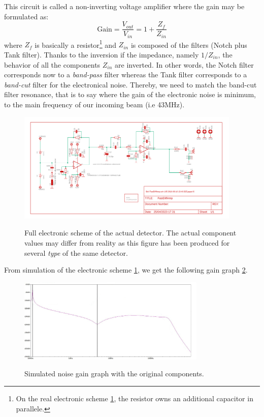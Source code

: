 \documentclass[10pt]{report}
\begin{document}
This circuit is called a non-inverting voltage amplifier where the gain may be formulated as:
\begin{equation}
\textrm{Gain} = \frac{V_{out}}{V_{in}} = 1 + \frac{Z_{f}}{Z_{in}}
\end{equation}
where $Z_f$ is basically a resistor\footnote{On the real electronic scheme \ref{fig:elec-scheme}, the resistor owns an additional capacitor in parallele.} and $Z_{in}$ is composed of the filters (Notch plus Tank filter). Thanks to the inversion if the impedance, namely $1/Z_{in}$, the behavior of all the components $Z_{in}$ are inverted. In other words, the Notch filter corresponds now to a \textit{band-pass} filter whereas the Tank filter corresponds to a \textit{band-cut} filter for the electronical noise. Thereby, we need to match the band-cut filter resonance, that is to say where the gain of the electronic noise is minimum, to the main frequency of our incoming beam (i.e 43MHz).

\begin{figure}[h!]
\caption{Full electronic scheme of the actual detector. The actual component values may differ from reality as this figure has been produced for several \textit{type} of the same detector.}
\centering
\includegraphics[width=0.95\textwidth]{elec-scheme}
\label{fig:elec-scheme}
\end{figure}

From simulation of the electronic scheme \ref{fig:elec-scheme}, we get the following gain graph \ref{fig:noise_gain_opamp_original}. 

\begin{figure}[h!]
\caption{Simulated noise gain graph with the original components.}
\centering
\includegraphics[width=0.8\textwidth]{noise_gain_opamp_original}
\label{fig:noise_gain_opamp_original}
\end{figure}
\end{document}
